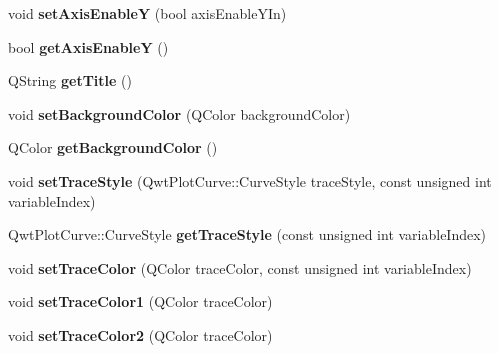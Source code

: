 \begin{DoxyCompactItemize}
\item 
\hypertarget{classQEPlot_a3236c8d1a3c6c969a88b475ef1b76465}{
void {\bfseries setAxisEnableY} (bool axisEnableYIn)}
\label{classQEPlot_a3236c8d1a3c6c969a88b475ef1b76465}

\item 
\hypertarget{classQEPlot_ae72570d8a7a65f1072f2a579439ee12b}{
bool {\bfseries getAxisEnableY} ()}
\label{classQEPlot_ae72570d8a7a65f1072f2a579439ee12b}

\item 
\hypertarget{classQEPlot_ad02ef9b37f98abdbe735c53f4a83a5fe}{
QString {\bfseries getTitle} ()}
\label{classQEPlot_ad02ef9b37f98abdbe735c53f4a83a5fe}

\item 
\hypertarget{classQEPlot_a5886b0f03798c3627ac4582ecb99d4ee}{
void {\bfseries setBackgroundColor} (QColor backgroundColor)}
\label{classQEPlot_a5886b0f03798c3627ac4582ecb99d4ee}

\item 
\hypertarget{classQEPlot_a453f42ad50351afca30a416261c9f754}{
QColor {\bfseries getBackgroundColor} ()}
\label{classQEPlot_a453f42ad50351afca30a416261c9f754}

\item 
\hypertarget{classQEPlot_a3321696366c15f96b248553d31eafe90}{
void {\bfseries setTraceStyle} (QwtPlotCurve::CurveStyle traceStyle, const unsigned int variableIndex)}
\label{classQEPlot_a3321696366c15f96b248553d31eafe90}

\item 
\hypertarget{classQEPlot_ad404d19b1df92c9f0ac7b079309e17a2}{
QwtPlotCurve::CurveStyle {\bfseries getTraceStyle} (const unsigned int variableIndex)}
\label{classQEPlot_ad404d19b1df92c9f0ac7b079309e17a2}

\item 
\hypertarget{classQEPlot_a2f294349f3ebf4d913dfc57421f90009}{
void {\bfseries setTraceColor} (QColor traceColor, const unsigned int variableIndex)}
\label{classQEPlot_a2f294349f3ebf4d913dfc57421f90009}

\item 
\hypertarget{classQEPlot_aa7f5cf31eb707c627271869733c2fa01}{
void {\bfseries setTraceColor1} (QColor traceColor)}
\label{classQEPlot_aa7f5cf31eb707c627271869733c2fa01}

\item 
\hypertarget{classQEPlot_a0b9652dd1825d5169d22f6ffef149763}{
void {\bfseries setTraceColor2} (QColor traceColor)}
\label{classQEPlot_a0b9652dd1825d5169d22f6ffef149763}


\end{DoxyCompactItemize}
